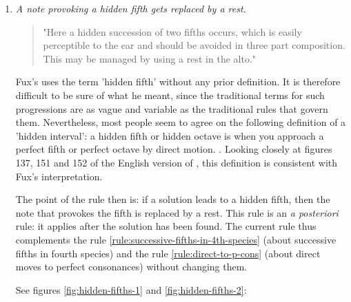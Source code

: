 \begin{enumerate}[wide, label=\bfseries 4.P\arabic*]
    \item \textit{A note provoking a hidden fifth gets replaced by a rest.} \label{rule:hidden-fifths}
    \begin{quotation}
        "Here a hidden succession of two fifths occurs, which is easily perceptible to the ear and should be avoided in three part composition. This may be managed by using a rest in the alto."
        \textcite[p.98]{GaPEng}
    \end{quotation}
    Fux's uses the term 'hidden fifth' without any prior definition. It is therefore difficult to be sure of what he meant, since the traditional terms for such progressions are as vague and variable as the traditional rules that govern them. Nevertheless, most people seem to agree on the following definition of a 'hidden interval': a hidden fifth or hidden octave is when you approach a perfect fifth or perfect octave by direct motion. \cite[p.31]{piston1987harmony}. Looking closely at figures 137, 151 and 152 of the English version of \gap, this definition is consistent with Fux's interpretation.

    The point of the rule then is: if a solution leads to a hidden fifth, then the note that provokes the fifth is replaced by a rest. This rule is an \textit{a posteriori} rule: it applies after the solution has been found.
    The current rule thus complements the rule \ref{rule:successive-fifths-in-4th-species} (about successive fifths in fourth species) and the rule \ref{rule:direct-to-p-cons} (about direct moves to perfect consonances) without changing them.
    
    See figures \ref{fig:hidden-fifths-1} and \ref{fig:hidden-fifths-2}:


\end{enumerate}
